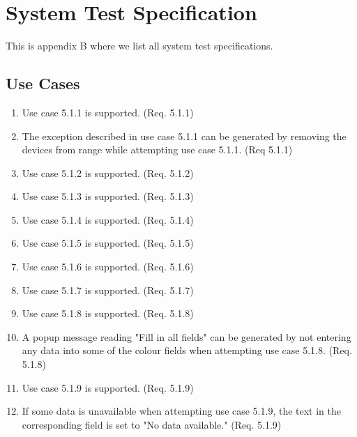 \documentclass[a4paper]{article}
\newlength{\testlabellength}
\newenvironment{testlist}{\begin{enumerate}[label=\bfseries Test \thesubsection.\arabic* , labelindent=0pt, labelwidth=\testlabellength , leftmargin=2cm]}{\end{enumerate}}
\begin{document}
\begin{appendices}
\begin{testlist}
\end{testlist}	

\newpage

\section{System Test Specification} \label{appendix:section:systemtest}
This is appendix B where we list all system test specifications.

\subsection{Use Cases}
\begin{testlist}
	\item Use case 5.1.1 is supported. (Req. 5.1.1)
	\item The exception described in use case 5.1.1 can be generated by removing the devices from range while attempting use case 5.1.1. (Req 5.1.1)
	
	\item Use case 5.1.2 is supported. (Req. 5.1.2)
	
	\item Use case 5.1.3 is supported. (Req. 5.1.3)
	
	\item Use case 5.1.4 is supported. (Req. 5.1.4)
	
	\item Use case 5.1.5 is supported. (Req. 5.1.5)
	
	\item Use case 5.1.6 is supported. (Req. 5.1.6)
	
	\item Use case 5.1.7 is supported. (Req. 5.1.7)
	
	\item Use case 5.1.8 is supported. (Req. 5.1.8)
	
	\item A popup message reading "Fill in all fields" can be generated by not entering any data into some of the colour fields when attempting use case 5.1.8. (Req. 5.1.8)
	
	\item Use case 5.1.9 is supported. (Req. 5.1.9)
	
	\item If some data is unavailable when attempting use case 5.1.9, the text in the corresponding field is set to "No data available." (Req. 5.1.9)
	

\end{testlist}
\end{appendices}
\end{document}
